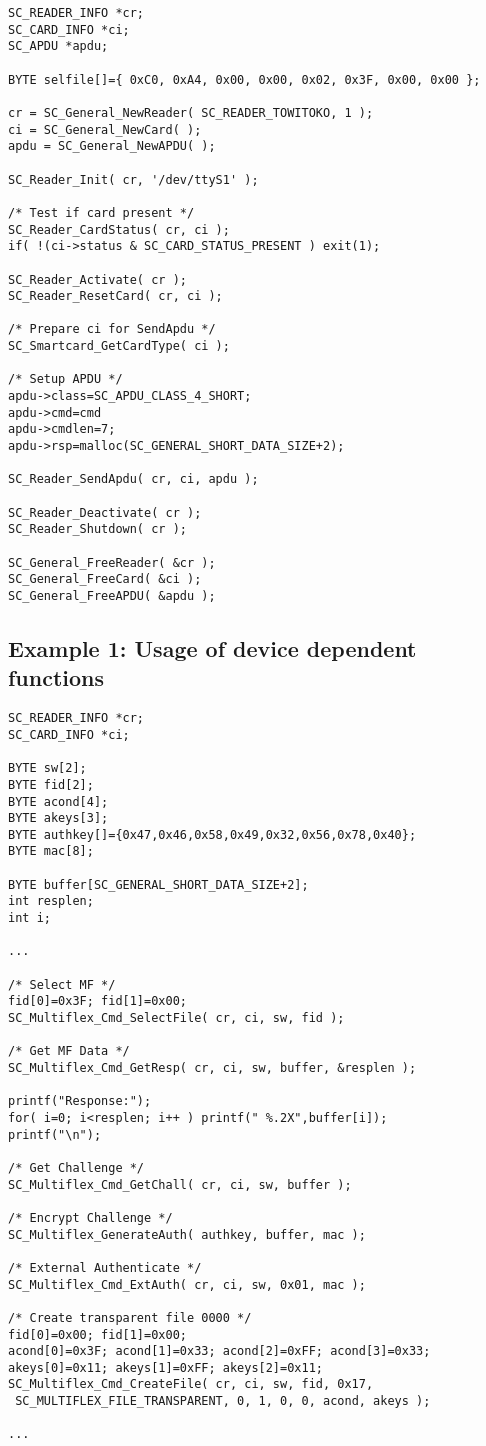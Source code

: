 \documentclass[a4paper,oneside]{article}
\begin{document}
\begin{verbatim}
SC_READER_INFO *cr;
SC_CARD_INFO *ci;
SC_APDU *apdu;

BYTE selfile[]={ 0xC0, 0xA4, 0x00, 0x00, 0x02, 0x3F, 0x00, 0x00 };

cr = SC_General_NewReader( SC_READER_TOWITOKO, 1 );
ci = SC_General_NewCard( );
apdu = SC_General_NewAPDU( );

SC_Reader_Init( cr, '/dev/ttyS1' );

/* Test if card present */
SC_Reader_CardStatus( cr, ci );
if( !(ci->status & SC_CARD_STATUS_PRESENT ) exit(1);

SC_Reader_Activate( cr );
SC_Reader_ResetCard( cr, ci );

/* Prepare ci for SendApdu */
SC_Smartcard_GetCardType( ci );

/* Setup APDU */
apdu->class=SC_APDU_CLASS_4_SHORT;
apdu->cmd=cmd
apdu->cmdlen=7;
apdu->rsp=malloc(SC_GENERAL_SHORT_DATA_SIZE+2);

SC_Reader_SendApdu( cr, ci, apdu );

SC_Reader_Deactivate( cr );
SC_Reader_Shutdown( cr );

SC_General_FreeReader( &cr );
SC_General_FreeCard( &ci );
SC_General_FreeAPDU( &apdu );
\end{verbatim}

\subsection{Example 1: Usage of device dependent functions}

\begin{verbatim}
SC_READER_INFO *cr;
SC_CARD_INFO *ci;

BYTE sw[2];
BYTE fid[2];
BYTE acond[4];
BYTE akeys[3];
BYTE authkey[]={0x47,0x46,0x58,0x49,0x32,0x56,0x78,0x40};
BYTE mac[8];

BYTE buffer[SC_GENERAL_SHORT_DATA_SIZE+2];
int resplen;
int i;

...

/* Select MF */
fid[0]=0x3F; fid[1]=0x00;
SC_Multiflex_Cmd_SelectFile( cr, ci, sw, fid );

/* Get MF Data */
SC_Multiflex_Cmd_GetResp( cr, ci, sw, buffer, &resplen );

printf("Response:");
for( i=0; i<resplen; i++ ) printf(" %.2X",buffer[i]);
printf("\n");

/* Get Challenge */
SC_Multiflex_Cmd_GetChall( cr, ci, sw, buffer );

/* Encrypt Challenge */
SC_Multiflex_GenerateAuth( authkey, buffer, mac );

/* External Authenticate */
SC_Multiflex_Cmd_ExtAuth( cr, ci, sw, 0x01, mac );

/* Create transparent file 0000 */
fid[0]=0x00; fid[1]=0x00;
acond[0]=0x3F; acond[1]=0x33; acond[2]=0xFF; acond[3]=0x33;
akeys[0]=0x11; akeys[1]=0xFF; akeys[2]=0x11;
SC_Multiflex_Cmd_CreateFile( cr, ci, sw, fid, 0x17,
 SC_MULTIFLEX_FILE_TRANSPARENT, 0, 1, 0, 0, acond, akeys );

...
\end{verbatim}
\end{document}
